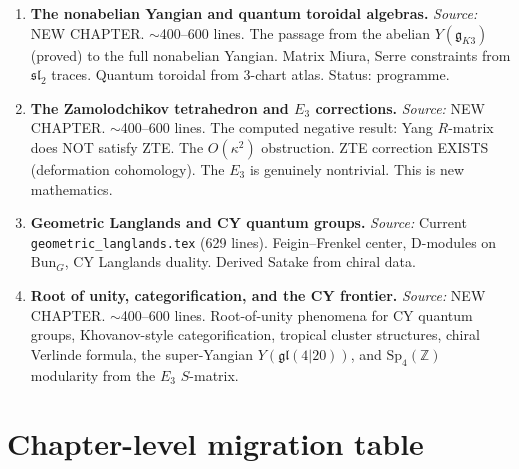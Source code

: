 \documentclass[11pt]{article}
\newcommand{\Z}{\mathbb{Z}}
\begin{document}
\begin{enumerate}[label=\textbf{Ch.\,\arabic*.},leftmargin=3.5em,start=29]
\item \textbf{The nonabelian Yangian and quantum toroidal algebras.}
 \textit{Source:} NEW CHAPTER. $\sim$400--600 lines. The passage
 from the abelian $Y(\mathfrak{g}_{K3})$ (proved) to the full
 nonabelian Yangian. Matrix Miura, Serre constraints from $\mathfrak{sl}_2$
 traces. Quantum toroidal from 3-chart atlas. Status: programme.

\item \textbf{The Zamolodchikov tetrahedron and $E_3$ corrections.}
 \textit{Source:} NEW CHAPTER. $\sim$400--600 lines. The computed
 negative result: Yang $R$-matrix does NOT satisfy ZTE. The $O(\kappa^2)$
 obstruction. ZTE correction EXISTS (deformation cohomology). The
 $E_3$ is genuinely nontrivial. This is new mathematics.

\item \textbf{Geometric Langlands and CY quantum groups.}
 \textit{Source:} Current \texttt{geometric\_langlands.tex}
 (629 lines). Feigin--Frenkel center, D-modules on $\mathrm{Bun}_G$,
 CY Langlands duality. Derived Satake from chiral data.

\item \textbf{Root of unity, categorification, and the CY frontier.}
 \textit{Source:} NEW CHAPTER. $\sim$400--600 lines. Root-of-unity
 phenomena for CY quantum groups, Khovanov-style categorification,
 tropical cluster structures, chiral Verlinde formula, the
 super-Yangian $Y(\mathfrak{gl}(4|20))$, and $\mathrm{Sp}_4(\Z)$
 modularity from the $E_3$ $S$-matrix.
\end{enumerate}


\section{Chapter-level migration table}
\end{document}
